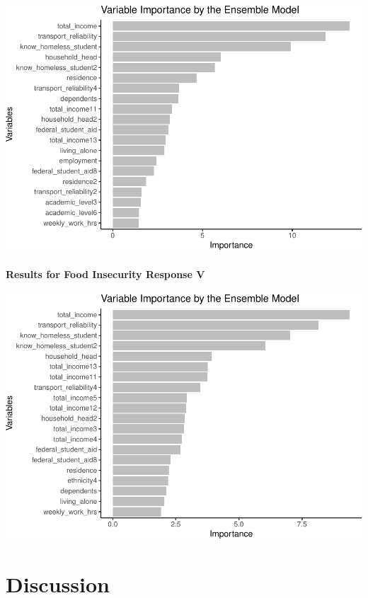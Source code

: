 \documentclass[
  10pt,
]{article}
\begin{document}
\includegraphics{phase2_report_files/figure-latex/unnamed-chunk-20-1}

\hypertarget{results-for-food-insecurity-response-v}{%
\paragraph{Results for Food Insecurity Response V}\label{results-for-food-insecurity-response-v}}

\includegraphics{phase2_report_files/figure-latex/unnamed-chunk-22-1}

\hypertarget{discussion}{%
\section{Discussion}\label{discussion}}
\end{document}
